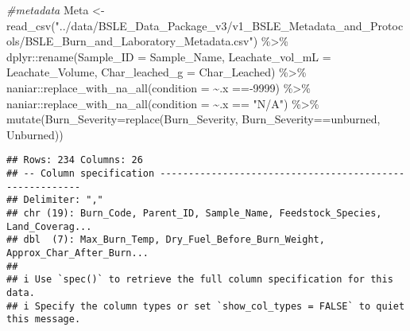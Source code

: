 \documentclass[
]{article}
\newenvironment{Shaded}{\begin{snugshade}}{\end{snugshade}}
\newcommand{\AttributeTok}[1]{\textcolor[rgb]{0.77,0.63,0.00}{#1}}
\newcommand{\CommentTok}[1]{\textcolor[rgb]{0.56,0.35,0.01}{\textit{#1}}}
\newcommand{\DecValTok}[1]{\textcolor[rgb]{0.00,0.00,0.81}{#1}}
\newcommand{\FunctionTok}[1]{\textcolor[rgb]{0.00,0.00,0.00}{#1}}
\newcommand{\NormalTok}[1]{#1}
\newcommand{\OtherTok}[1]{\textcolor[rgb]{0.56,0.35,0.01}{#1}}
\newcommand{\SpecialCharTok}[1]{\textcolor[rgb]{0.00,0.00,0.00}{#1}}
\newcommand{\StringTok}[1]{\textcolor[rgb]{0.31,0.60,0.02}{#1}}
\begin{document}
\begin{Shaded}
\begin{Highlighting}[]
\CommentTok{\#metadata}
\NormalTok{Meta }\OtherTok{\textless{}{-}} \FunctionTok{read\_csv}\NormalTok{(}\StringTok{"../data/BSLE\_Data\_Package\_v3/v1\_BSLE\_Metadata\_and\_Protocols/BSLE\_Burn\_and\_Laboratory\_Metadata.csv"}\NormalTok{) }\SpecialCharTok{\%\textgreater{}\%}
\NormalTok{  dplyr}\SpecialCharTok{::}\FunctionTok{rename}\NormalTok{(}\AttributeTok{Sample\_ID =}\NormalTok{ Sample\_Name,}
                \AttributeTok{Leachate\_vol\_mL =}\NormalTok{ Leachate\_Volume,}
                \AttributeTok{Char\_leached\_g =}\NormalTok{ Char\_Leached) }\SpecialCharTok{\%\textgreater{}\%}
\NormalTok{  naniar}\SpecialCharTok{::}\FunctionTok{replace\_with\_na\_all}\NormalTok{(}\AttributeTok{condition =} \SpecialCharTok{\textasciitilde{}}\NormalTok{.x }\SpecialCharTok{=={-}}\DecValTok{9999}\NormalTok{) }\SpecialCharTok{\%\textgreater{}\%}
\NormalTok{  naniar}\SpecialCharTok{::}\FunctionTok{replace\_with\_na\_all}\NormalTok{(}\AttributeTok{condition =} \SpecialCharTok{\textasciitilde{}}\NormalTok{.x }\SpecialCharTok{==} \StringTok{"N/A"}\NormalTok{) }\SpecialCharTok{\%\textgreater{}\%}
  \FunctionTok{mutate}\NormalTok{(}\AttributeTok{Burn\_Severity=}\FunctionTok{replace}\NormalTok{(Burn\_Severity, Burn\_Severity}\SpecialCharTok{==}\StringTok{\textquotesingle{}unburned\textquotesingle{}}\NormalTok{, }\StringTok{\textquotesingle{}Unburned\textquotesingle{}}\NormalTok{))}
\end{Highlighting}
\end{Shaded}

\begin{verbatim}
## Rows: 234 Columns: 26
## -- Column specification --------------------------------------------------------
## Delimiter: ","
## chr (19): Burn_Code, Parent_ID, Sample_Name, Feedstock_Species, Land_Coverag...
## dbl  (7): Max_Burn_Temp, Dry_Fuel_Before_Burn_Weight, Approx_Char_After_Burn...
## 
## i Use `spec()` to retrieve the full column specification for this data.
## i Specify the column types or set `show_col_types = FALSE` to quiet this message.
\end{verbatim}
\end{document}
